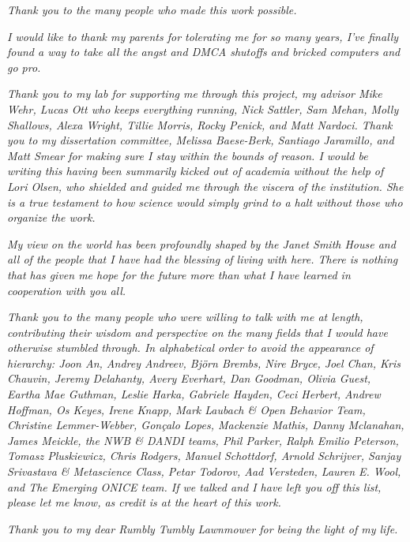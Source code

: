 \begin{acknowledgements}
\textit{Thank you to the many people who made this work possible.}

\textit{I would like to thank my parents for tolerating me for so many years, I've finally found a way to take all the angst and DMCA shutoffs and bricked computers and go pro.}

\textit{Thank you to my lab for supporting me through this project, my advisor Mike Wehr, Lucas Ott who keeps everything running, Nick Sattler, Sam Mehan, Molly Shallows, Alexa Wright, Tillie Morris, Rocky Penick, and Matt Nardoci. Thank you to my dissertation committee, Melissa Baese-Berk, Santiago Jaramillo, and Matt Smear for making sure I stay within the bounds of reason. I would be writing this having been summarily kicked out of academia without the help of Lori Olsen, who shielded and guided me through the viscera of the institution. She is a true testament to how science would simply grind to a halt without those who organize the work.}

\textit{My view on the world has been profoundly shaped by the Janet Smith House and all of the people that I have had the blessing of living with here. There is nothing that has given me hope for the future more than what I have learned in cooperation with you all.}

\textit{Thank you to the many people who were willing to talk with me at length, contributing their wisdom and perspective on the many fields that I would have otherwise stumbled through. In alphabetical order to avoid the appearance of hierarchy: Joon An, Andrey Andreev, Björn Brembs, Nire Bryce, Joel Chan, Kris Chauvin, Jeremy Delahanty, Avery Everhart, Dan Goodman, Olivia Guest, Eartha Mae Guthman, Leslie Harka, Gabriele Hayden, Ceci Herbert, Andrew Hoffman, Os Keyes, Irene Knapp, Mark Laubach \& Open Behavior Team, Christine Lemmer-Webber, Gonçalo Lopes, Mackenzie Mathis, Danny Mclanahan, James Meickle, the NWB \& DANDI teams, Phil Parker, Ralph Emilio Peterson, Tomasz Pluskiewicz, Chris Rodgers, Manuel Schottdorf, Arnold Schrijver, Sanjay Srivastava \& Metascience Class, Petar Todorov, Aad Versteden, Lauren E. Wool, and The Emerging ONICE team. If we talked and I have left you off this list, please let me know, as credit is at the heart of this work.}

\textit{Thank you to my dear Rumbly Tumbly Lawnmower for being the light of my life.}

\end{acknowledgements}